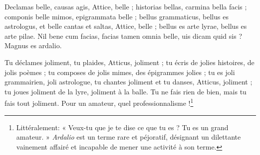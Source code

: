 \documentclass[12pt]{book} %
\begin{document}
\begin{alignment}
  \begin{edition}
          Declamas belle, causas agis, Attice, belle ; 
          historias bellas, carmina bella facis ; 
          componis belle mimos, epigrammata belle ; 
          bellus grammaticus, bellus es astrologus,  
          et belle cantas et saltas, Attice, belle ; 
          bellus es arte lyrae, bellus es arte pilae. 
          Nil bene cum facias, facias tamen omnia belle, 
          uis dicam quid sis ? Magnus es ardalio. 
  \end{edition}
  \begin{translation}
          Tu déclames joliment, tu plaides, Atticus, joliment ; 
          tu écris de jolies histoires, de jolis poèmes ; 
          tu composes de jolis mimes, des épigrammes jolies ; 
          tu es joli grammairien, joli astrologue, 
          tu chantes joliment et tu danses, Atticus, joliment ; 
          tu joues joliment de la lyre, joliment à la balle. 
          Tu ne fais rien de bien, mais tu fais tout joliment. 
          Pour un amateur, quel professionnalisme !\footnote{Littéralement: « Veux-tu que je te dise ce que tu es ? Tu es un grand amateur. » \emph{Ardalio} est un terme rare et péjoratif, désignant un dilettante vainement affairé et incapable de mener une activité à son terme.} 
  \end{translation}
\end{alignment}

\end{document}
